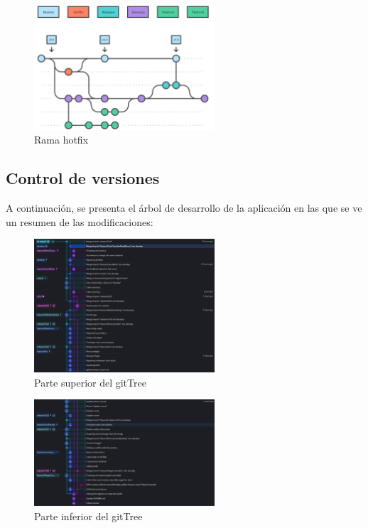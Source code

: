 \begin{figure}[htb]
	\centering
	\includegraphics[width=0.6\textwidth]{./imagenes/hotfix}
	\caption{Rama hotfix}
\end{figure}

\subsection{Control de versiones}

\quad A continuación, se presenta el árbol de desarrollo de la aplicación en las que se ve un resumen de las modificaciones:

\begin{figure}[htb]
	\centering
	\includegraphics[width=0.6\textwidth]{./imagenes/git-tree1}
	\caption{Parte superior del gitTree}
\end{figure}

\begin{figure}[htb]
	\centering
	\includegraphics[width=0.6\textwidth]{./imagenes/git-tree2}
	\caption{Parte inferior del gitTree}
\end{figure}

